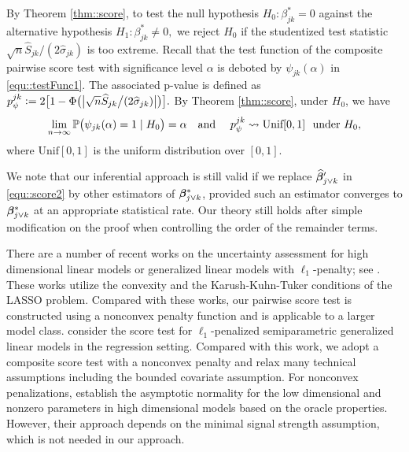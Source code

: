 \documentclass[twoside,11pt]{article}
\newcommand{\defeq}{\vcentcolon=}
\newcommand*{\limn}{\lim \limits_{n\rightarrow \infty} }
\begin{document}
By Theorem \ref{thm::score}, to test the null hypothesis $H_0\colon  \beta^* _{jk}=0$ against the alternative hypothesis $H_1\colon \!\beta^* _{jk} \neq 0, $
 we reject $H_0$ if the studentized test statistic $\sqrt{n} \hat{S}_{jk} \big/(2\hat{\sigma}_{jk})$ is too extreme. 
Recall that the test function of the composite pairwise score test with significance level $\alpha$ is deboted by  $\psi_{jk}(\alpha)$ in \eqref{equ::testFunc1}.
The associated p-value is defined as $p_{\psi}^{jk}\defeq 2 \bigl[1- \Phi \bigl(\bigl |  \sqrt{n} \hat{S}_{jk} \big/(2\hat{\sigma}_{jk})\bigr|  \bigr)\bigr].$ By Theorem \ref{thm::score}, under $H_0$, we have 
\begin{align*}
\limn \PP\bigl(\psi_{jk}(\alpha) = 1\mid H_0\bigr) = \alpha \quad \text {and }\quad 
p _{\psi}^{jk} \leadsto \text{Unif} [0,1]~~\text{under}~ H_0,
\end{align*}
where $\text{Unif}[0,1]$ is  the uniform distribution over  $[0,1].$


 We note that our inferential approach is still valid if we replace $\widehat {\bm{\beta}}_{j\vee k} '$ in \eqref{equ::score2} by other estimators of $\bm{\beta}_{j \vee k}^*$, provided such an estimator  converges to $\bm{\beta}_{j \vee k}^*$ at an appropriate statistical rate. Our theory still holds after simple modification on the proof when controlling the order of the remainder terms. 





 
\begin{remark}
	There are a number of recent works on the uncertainty assessment for high dimensional linear models or generalized linear models with $\ell_1$-penalty; see \cite{lee2016exact,lockhart2014significance,belloni2012sparse,belloni2013honest,zhang2014confidence,javanmard2013confidence,van2013asymptotically}. These works utilize the convexity and the Karush-Kuhn-Tuker conditions of the LASSO problem. Compared with these works, our pairwise score test is constructed using a nonconvex penalty function and is applicable to a larger model class. \cite{ning2014sparc} consider the score test for $\ell_1$-penalized semiparametric generalized linear models in the regression setting. Compared with this work, we adopt a composite score test with a nonconvex penalty and relax many technical assumptions including the bounded covariate assumption. For nonconvex penalizations, \cite{fan2011nonconcave,bradic2011penalized} establish the asymptotic normality for the low dimensional and nonzero parameters in high dimensional models based on the oracle properties. However, their approach depends on the minimal signal strength assumption, which  is not needed in our approach. 
\end{remark}
\end{document}
